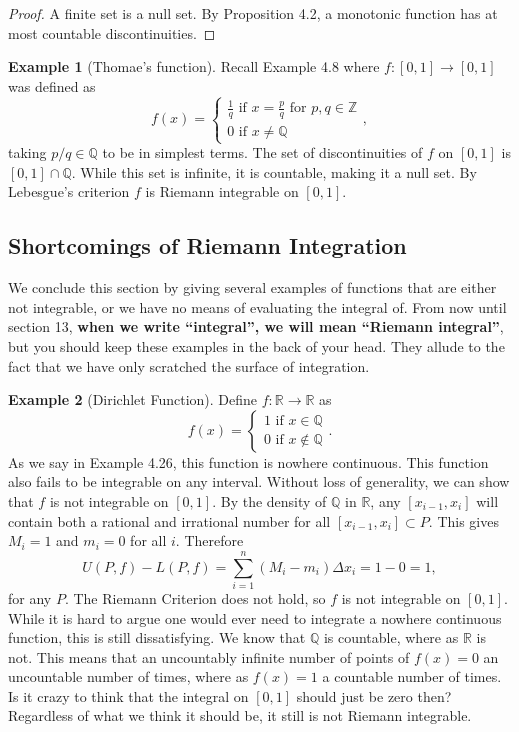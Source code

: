 \documentclass{article}
\newcommand{\R}{\mathbb{R}}
\newcommand{\Q}{\mathbb{Q}}
\newcommand{\Z}{\mathbb{Z}}
\theoremstyle{definition}
\newtheorem{example}{Example}[section]
\begin{document}
	\begin{proof}
		A finite set is a null set. By Proposition 4.2, a monotonic function has at most countable discontinuities. 
		\end{proof}
	\begin{example}[Thomae's function]
		Recall Example 4.8 where $ f:[0,1]\to[0,1] $ was defined as $$f(x)=\begin{cases}
			\frac{1}{q} \text{ if }x=\frac{p}{q}\text{ for }p,q\in\Z\\
			0\text{ if }x\neq\Q
		\end{cases} ,$$ taking $ p/q\in\Q $ to be in simplest terms. The set of discontinuities of $ f $ on $ [0,1] $ is $ [0,1]\cap\Q $. While this set is infinite, it is countable, making it a null set. By Lebesgue's criterion $ f $ is Riemann integrable on $ [0,1] $. 
	\end{example}
	\subsection{Shortcomings of Riemann Integration}
	We conclude this section by giving several examples of functions that are either not integrable, or we have no means of evaluating the integral of. From now until section 13,\textbf{ when we write ``integral'', we will mean ``Riemann integral''}, but you should keep these examples in the back of your head. They allude to the fact that we have only scratched the surface of integration.
	\begin{example}[Dirichlet Function]
		Define $ f:\R\to\R $ as $$f(x)=\begin{cases}
			1\text{ if }x\in\Q\\0\text{ if }x\notin\Q
		\end{cases} .$$ As we say in Example 4.26, this function is nowhere continuous. This function also fails to be integrable on any interval. Without loss of generality, we can show that $ f $ is not integrable on $ [0,1] $. By the density of $ \Q $ in $ \R $, any $ [x_{i-1},x_i] $ will contain both a rational and irrational number for all $ [x_{i-1},x_i]\subset P $. This gives $ M_i=1 $ and $ m_i=0 $ for all $ i $. Therefore $$U(P,f)-L(P,f)=\sum_{i=1}^{n}(M_i-m_i)\Delta x_i=1-0=1 ,$$ for any $ P $. The Riemann Criterion does not hold, so $ f $ is not integrable on $ [0,1] $. While it is hard to argue one would ever need to integrate a nowhere continuous function, this is still dissatisfying. We know that $ \Q $ is countable, where as $ \R $ is not. This means that an uncountably infinite number of points of $ f(x)=0 $ an uncountable number of times, where as $ f(x)=1 $ a countable number of times. Is it crazy to think that the integral on $ [0,1]$ should just be zero then? Regardless of what we think it should be, it still is not Riemann integrable.
	\end{example}
	
\end{document}
